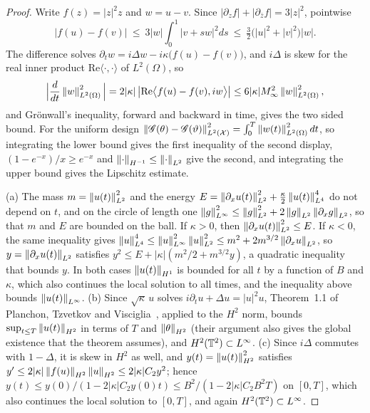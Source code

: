 \begin{proof}
Write $f(z)=|z|^2z$ and $w=u-v$. Since $|\partial_zf|+|\partial_{\bar z}f|=3|z|^2$, pointwise
\[
|f(u)-f(v)|\ \le\ 3|w|\int_0^1|v+sw|^2ds\ \le\ \tfrac32\big(|u|^2+|v|^2\big)|w| .
\]
The difference solves $\partial_tw=i\Delta w-i\kappa\big(f(u)-f(v)\big)$, and $i\Delta$ is skew for the real inner product $\mathrm{Re}\langle\cdot,\cdot\rangle$ of $L^2(\Omega)$, so
\[
\Big|\frac d{dt}\left\|w\right\|^2_{L^2(\Omega)}\Big|=2|\kappa|\,\big|\mathrm{Re}\big\langle f(u)-f(v),iw\big\rangle\big|\le6|\kappa|M_\infty^2\left\|w\right\|^2_{L^2(\Omega)},
\]
and Gr\"onwall's inequality, forward and backward in time, gives the two sided bound. For the uniform design $\left\|\mathscr{G}(\theta)-\mathscr{G}(\vartheta)\right\|^2_{L^2(\mathcal X)}=\int_0^T\left\|w(t)\right\|^2_{L^2(\Omega)}dt$, so integrating the lower bound gives the first inequality of the second display, $(1-e^{-x})/x\ge e^{-x}$ and $\left\|\cdot\right\|_{H^{-1}}\le\left\|\cdot\right\|_{L^2}$ give the second, and integrating the upper bound gives the Lipschitz estimate.

(a) The mass $m=\left\|u(t)\right\|^2_{L^2}$ and the energy $E=\left\|\partial_xu(t)\right\|^2_{L^2}+\frac\kappa2\left\|u(t)\right\|^4_{L^4}$ do not depend on $t$, and on the circle of length one $\left\|g\right\|^2_{L^\infty}\le\left\|g\right\|^2_{L^2}+2\left\|g\right\|_{L^2}\left\|\partial_xg\right\|_{L^2}$, so that $m$ and $E$ are bounded on the ball. If $\kappa>0$, then $\left\|\partial_xu(t)\right\|^2_{L^2}\le E$. If $\kappa<0$, the same inequality gives $\left\|u\right\|^4_{L^4}\le\left\|u\right\|^2_{L^\infty}\left\|u\right\|^2_{L^2}\le m^2+2m^{3/2}\left\|\partial_xu\right\|_{L^2}$, so $y=\left\|\partial_xu(t)\right\|_{L^2}$ satisfies $y^2\le E+|\kappa|(m^2/2+m^{3/2}y)$, a quadratic inequality that bounds $y$. In both cases $\left\|u(t)\right\|_{H^1}$ is bounded for all $t$ by a function of $B$ and $\kappa$, which also continues the local solution to all times, and the inequality above bounds $\left\|u(t)\right\|_{L^\infty}$. (b) Since $\sqrt\kappa\,u$ solves $i\partial_tu+\Delta u=|u|^2u$, Theorem~1.1 of Planchon, Tzvetkov and Visciglia~\cite{ptv2017}, applied to the $H^2$ norm, bounds $\sup_{t\le T}\left\|u(t)\right\|_{H^2}$ in terms of $T$ and $\left\|\theta\right\|_{H^2}$ (their argument also gives the global existence that the theorem assumes), and $H^2(\mathbb{T}^2)\subset L^\infty$. (c) Since $i\Delta$ commutes with $1-\Delta$, it is skew in $H^2$ as well, and $y(t)=\left\|u(t)\right\|^2_{H^2}$ satisfies $y'\le2|\kappa|\left\|f(u)\right\|_{H^2}\left\|u\right\|_{H^2}\le2|\kappa|C_2y^2$; hence $y(t)\le y(0)/(1-2|\kappa|C_2y(0)t)\le B^2/(1-2|\kappa|C_2B^2T)$ on $[0,T]$, which also continues the local solution to $[0,T]$, and again $H^2(\mathbb{T}^2)\subset L^\infty$.
\end{proof}

